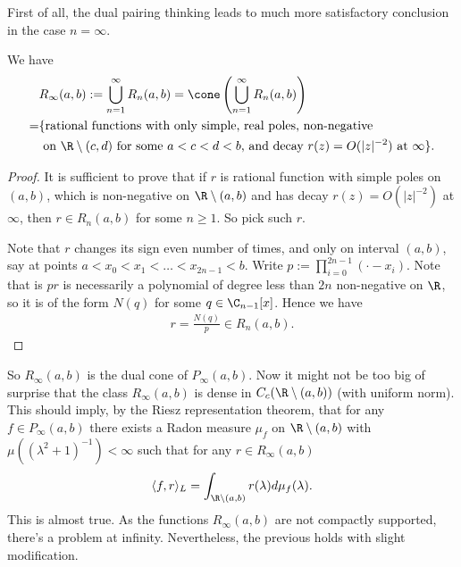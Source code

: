 First of all, the dual pairing thinking leads to much more satisfactory conclusion in the case $n = \infty$.

\begin{lem}
	We have
	\begin{align*}
		&R_{\infty}(a, b) := \bigcup_{n = 1}^{\infty} R_{n}(a, b) = \cone\left( \bigcup_{n = 1}^{\infty} R_{n}(a, b)\right) \\
		= &\{ \text{rational functions with only simple, real poles, non-negative} \\
		& \text{ on $\R \setminus (c, d)$ for some $a < c < d < b$, and decay $r(z) = O(|z|^{-2})$ at $\infty$} \}.
	\end{align*}
\end{lem}
\begin{proof}
	It is sufficient to prove that if $r$ is rational function with simple poles on $(a, b)$, which is non-negative on $\R \setminus (a, b)$ and has decay $r(z) = O(|z|^{-2})$ at $\infty$, then $r \in R_{n}(a, b)$ for some $n \geq 1$. So pick such $r$.

	Note that $r$ changes its sign even number of times, and only on interval $(a, b)$, say at points $a < x_{0} < x_{1} < \ldots < x_{2 n - 1} < b$. Write $p := \prod_{i = 0}^{2 n - 1} (\cdot - x_{i})$. Note that is $p r$ is necessarily a polynomial of degree less than $2 n$ non-negative on $\R$, so it is of the form $N(q)$ for some $q \in \C_{n - 1}[x]$. Hence we have
	\begin{align*}
		r = \frac{N(q)}{p} \in R_{n}(a, b).
	\end{align*}
\end{proof}

So $R_{\infty}(a, b)$ is the dual cone of $P_{\infty}(a, b)$. Now it might not be too big of surprise that the class $R_{\infty}(a, b)$ is dense in $C_{c}(\R \setminus (a, b))$ (with uniform norm). This should imply, by the Riesz representation theorem, that for any $f \in P_{\infty}(a, b)$ there exists a Radon measure $\mu_{f}$ on $\R \setminus (a, b)$ with $\mu((\lambda^2 + 1)^{-1}) < \infty$ such that for any $r \in R_{\infty}(a, b)$
\begin{align*}
	\langle f, r \rangle_{L} = \int_{\R \setminus (a, b)} r(\lambda) d \mu_{f}(\lambda).
\end{align*}
This is almost true. As the functions $R_{\infty}(a, b)$ are not compactly supported, there's a problem at infinity.  Nevertheless, the previous holds with slight modification.

